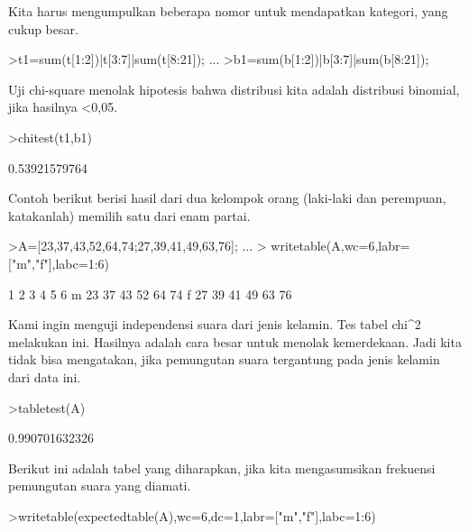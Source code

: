 \documentclass[a4paper,10pt]{article}
\begin{document}
\begin{eulernotebook}
\begin{eulercomment}
Kita harus mengumpulkan beberapa nomor untuk mendapatkan kategori,
yang cukup besar.
\end{eulercomment}
\begin{eulerprompt}
>t1=sum(t[1:2])|t[3:7]|sum(t[8:21]); ...
>b1=sum(b[1:2])|b[3:7]|sum(b[8:21]);
\end{eulerprompt}
\begin{eulercomment}
Uji chi-square menolak hipotesis bahwa distribusi kita adalah
distribusi binomial, jika hasilnya \textless{}0,05.
\end{eulercomment}
\begin{eulerprompt}
>chitest(t1,b1)
\end{eulerprompt}
\begin{euleroutput}
  0.53921579764
\end{euleroutput}
\begin{eulercomment}
Contoh berikut berisi hasil dari dua kelompok orang (laki-laki dan
perempuan, katakanlah) memilih satu dari enam partai.
\end{eulercomment}
\begin{eulerprompt}
>A=[23,37,43,52,64,74;27,39,41,49,63,76];  ...
>  writetable(A,wc=6,labr=["m","f"],labc=1:6)
\end{eulerprompt}
\begin{euleroutput}
             1     2     3     4     5     6
       m    23    37    43    52    64    74
       f    27    39    41    49    63    76
\end{euleroutput}
\begin{eulercomment}
Kami ingin menguji independensi suara dari jenis kelamin. Tes tabel
chi\textasciicircum{}2 melakukan ini. Hasilnya adalah cara besar untuk menolak
kemerdekaan. Jadi kita tidak bisa mengatakan, jika pemungutan suara
tergantung pada jenis kelamin dari data ini.
\end{eulercomment}
\begin{eulerprompt}
>tabletest(A)
\end{eulerprompt}
\begin{euleroutput}
  0.990701632326
\end{euleroutput}
\begin{eulercomment}
Berikut ini adalah tabel yang diharapkan, jika kita mengasumsikan
frekuensi pemungutan suara yang diamati.
\end{eulercomment}
\begin{eulerprompt}
>writetable(expectedtable(A),wc=6,dc=1,labr=["m","f"],labc=1:6)

\end{eulerprompt}
\end{eulernotebook}
\end{document}
